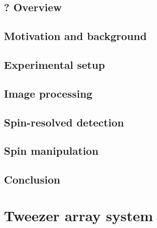 \documentclass[twoside]{article}
\begin{document}

\subsection{? Overview} \label{subsec:imaging-overview} %


\subsection{Motivation and background} \label{subsec:imaging-motivation}

\subsection{Experimental setup} \label{subsec:imaging-setup}

\subsection{Image processing} \label{subsec:imaging-processing}

\subsection{Spin-resolved detection} \label{subsec:imaging-spin}

\subsection{Spin manipulation} \label{subsec:imaging-flip}


\subsection{Conclusion} \label{subsec:imaging-conclusion}



\newpage
\section{Tweezer array system} \label{sec:tweezer}
\end{document}
